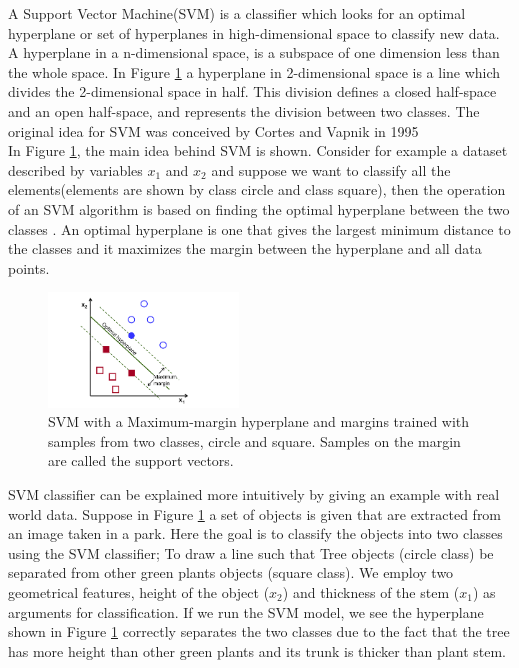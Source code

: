 A Support Vector Machine(SVM) is a classifier which looks for an optimal hyperplane or set of hyperplanes in high-dimensional space to classify new data. A hyperplane in a n-dimensional space, is a subspace of one dimension less than the whole space. In Figure \ref{fig:SVM} a hyperplane in 2-dimensional space is a line which divides the 2-dimensional space in half. This division defines a closed half-space and an open half-space, and represents the division between two classes. The original idea for SVM was conceived by Cortes and Vapnik in 1995 \cite{cortes1995support} \\
In Figure \ref{fig:SVM}, the main idea behind SVM is shown. Consider for example a dataset described by variables $x_1$ and $x_2$ and suppose we want to classify all the elements(elements are shown by class circle and class square), then the operation of an SVM algorithm is based on finding the optimal hyperplane between the two classes \cite{opencv_library}. An optimal hyperplane is one that gives the largest minimum distance to the classes and it maximizes the margin between the hyperplane and all data points. %

\begin{figure}[H]
    \includegraphics[width=0.45\textwidth]{./img/SVM.png}
    \caption{\footnotesize{SVM with a Maximum-margin hyperplane and margins trained with samples from two classes, circle and square. Samples on the margin are called the support vectors.\cite{wiki:SVM}}}
    \label{fig:SVM}
\end{figure}

SVM classifier can be explained more intuitively by giving an example with real world data. Suppose in Figure \ref{fig:SVM} a set of objects is given that are extracted from an image taken in a park. Here the goal is to classify the objects into two classes using the SVM classifier; To draw a line such that Tree objects (circle class) be separated from other  green plants objects (square class). We employ two geometrical features, height of the object ($x_2$) and thickness of the stem ($x_1$) as arguments for classification. If we run the SVM model, we see the hyperplane shown in Figure \ref{fig:SVM} correctly separates the two classes due to the fact that the tree has more height than other green plants and its trunk is thicker than plant stem.\\  

